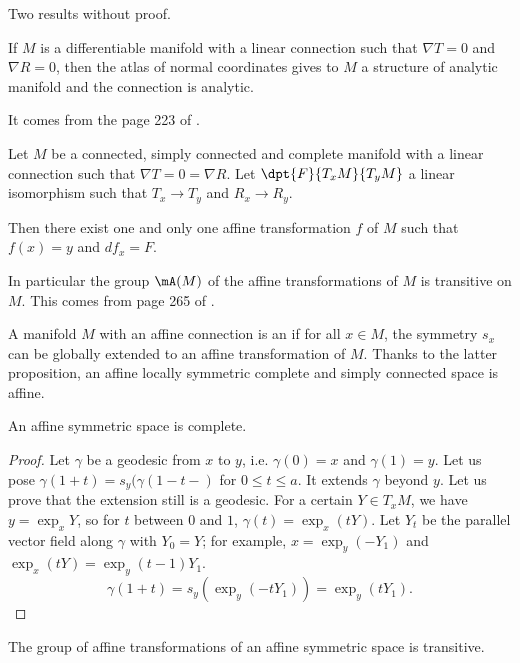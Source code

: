 Two results without proof.

\begin{theorem}
If $M$ is a differentiable manifold with a linear connection such that $\nabla T=0$ and $\nabla R=0$, then the atlas of normal coordinates gives to $M$ a structure of analytic manifold and the connection is analytic.
\end{theorem}
It comes from the page 223 of \cite{kobayashi}.

\begin{proposition}
Let $M$ be a connected, simply connected and complete manifold with a linear connection such that $\nabla T=0=\nabla R$. Let $\dpt{F}{T_xM}{T_yM}$ a linear isomorphism such that $T_x\to T_y$ and $R_x\to R_y$.

Then there exist one and only one affine transformation $f$ of $M$ such that $f(x)=y$ and $df_x=F$.
\end{proposition}
In particular the group $\mA(M)$ of the affine transformations of $M$ is transitive on $M$. This comes from page 265 of \cite{kobayashi}.

A manifold $M$ with an affine connection is an  if for all $x\in M$, the symmetry $s_x$ can be globally extended to an affine transformation of $M$. Thanks to the latter proposition, an affine locally symmetric complete and simply connected space is affine.

 
\begin{proposition}
An affine symmetric space is complete.
\end{proposition}

\begin{proof}
Let $\gamma$ be a geodesic from $x$ to $y$, i.e. $\gamma(0)=x$ and $\gamma(1)=y$. Let us pose $\gamma(1+t)=s_y(\gamma(1-t-)$ for $0\leq t\leq a$. It extends $\gamma$ beyond $y$. Let us prove that the extension still is a geodesic. For a certain $Y\in T_xM$, we have $y=\exp_xY$, so for $t$ between $0$ and $1$, $\gamma(t)=\exp_x(tY)$. Let $Y_t$ be the parallel vector field along $\gamma$ with $Y_0=Y$; for example, $x=\exp_y(-Y_1)$ and $\exp_x(tY)=\exp_y(t-1)Y_1$.
\begin{equation}
   \gamma(1+t)=s_y(\exp_y(-tY_1))
              =\exp_y(tY_1).
\end{equation}
\end{proof}

\begin{proposition}
The group of affine transformations of an affine symmetric space is transitive.
\end{proposition}

